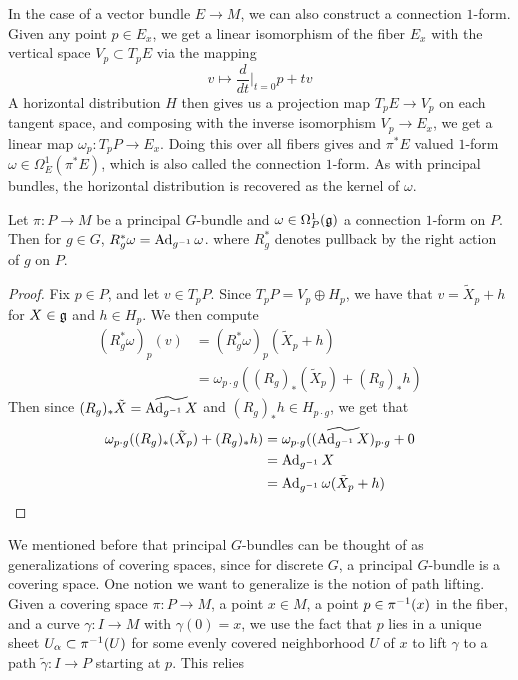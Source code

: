 In the case of a vector bundle $E \to M$, we can also construct a connection
$1$-form. Given any point $p \in E_x$, we get a linear isomorphism of the
fiber $E_x$ with the vertical space $V_p \subset T_pE$ via the mapping
\[
v \mapsto \frac{d}{dt}\bigg\vert_{t = 0} p + tv
\]
A horizontal distribution $H$ then gives us a projection map $T_pE \to V_p$
on each tangent space, and composing with the inverse isomorphism $V_p \to E_x$,
we get a linear map $\omega_p : T_pP \to E_x$. Doing this over all fibers gives
and $\pi^* E$ valued $1$-form $\omega \in \Omega^1_E(\pi^*E)$, which is
also called the connection $1$-form. As with principal bundles, the horizontal
distribution is recovered as the kernel of $\omega$.
%
\begin{prop}
Let $\pi : P \to M$ be a principal $G$-bundle and $\omega \in \Omega^1_P(\mathfrak{g})$ a
connection $1$-form on $P$. Then for $g \in G$, $R_g^*\omega = \operatorname{Ad}_{g^{-1}}\omega$.
where $R_g^*$ denotes pullback by the right action of $g$ on $P$.
\end{prop}
%
\begin{proof}
Fix $p \in P$, and let $v \in T_pP$. Since $T_pP = V_p \oplus H_p$, we have
that $v = \tilde{X}_p + h$ for $X \in \mathfrak{g}$ and $h \in H_p$. We then compute
\begin{align*}
(R_g^*\omega)_p(v) &= (R_g^*\omega)_p(\tilde{X}_p + h) \\
&= \omega_{p \cdot g}((R_g)_*(\tilde{X}_p ) + (R_g)_*h)
\end{align*}
Then since $(R_g)_*\tilde{X} = \widetilde{\operatorname{Ad}_{g^{-1}}X}$ and
$(R_g)_*h \in H_{p \cdot g}$, we get that
\begin{align*}
\omega_{p \cdot g}((R_g)_*(\tilde{X}_p ) + (R_g)_*h) &=
\omega_{p \cdot g}((\widetilde{\operatorname{Ad}_{g^{-1}}X})_{p\cdot g} + 0 \\
&= \operatorname{Ad}_{g^{-1}} X \\
&= \operatorname{Ad}_{g^{-1}}\omega(\tilde{X}_p + h)
\end{align*}
\end{proof}
%
We mentioned before that principal $G$-bundles can be thought of as
generalizations of covering spaces, since for discrete $G$, a principal $G$-bundle
is a covering space. One notion we want to generalize is the notion of path
lifting. Given a covering space $\pi : P \to M$, a point $x \in M$, a point
$p \in \pi^{-1}(x)$ in the fiber, and a curve $\gamma : I \to M$ with
$\gamma(0) = x$, we use the fact that $p$ lies in a unique sheet
$U_\alpha \subset \pi^{-1}(U)$ for some evenly covered neighborhood $U$ of $x$
to lift $\gamma$ to a path $\tilde{\gamma} : I \to P$ starting at $p$. This relies

